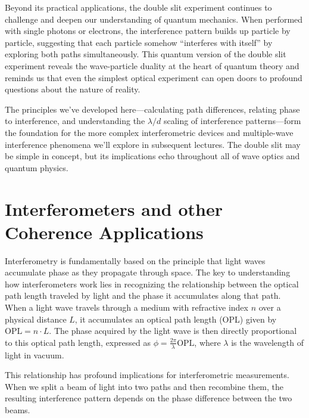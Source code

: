 \documentclass[
  a4paper,
]{book}
\begin{document}
Beyond its practical applications, the double slit experiment continues
to challenge and deepen our understanding of quantum mechanics. When
performed with single photons or electrons, the interference pattern
builds up particle by particle, suggesting that each particle somehow
``interferes with itself'' by exploring both paths simultaneously. This
quantum version of the double slit experiment reveals the wave-particle
duality at the heart of quantum theory and reminds us that even the
simplest optical experiment can open doors to profound questions about
the nature of reality.

The principles we've developed here---calculating path differences,
relating phase to interference, and understanding the \(\lambda/d\)
scaling of interference patterns---form the foundation for the more
complex interferometric devices and multiple-wave interference phenomena
we'll explore in subsequent lectures. The double slit may be simple in
concept, but its implications echo throughout all of wave optics and
quantum physics.

\chapter{Interferometers and other Coherence
Applications}\label{interferometers-and-other-coherence-applications}

Interferometry is fundamentally based on the principle that light waves
accumulate phase as they propagate through space. The key to
understanding how interferometers work lies in recognizing the
relationship between the optical path length traveled by light and the
phase it accumulates along that path. When a light wave travels through
a medium with refractive index \(n\) over a physical distance \(L\), it
accumulates an optical path length (OPL) given by
\(\text{OPL} = n \cdot L\). The phase acquired by the light wave is then
directly proportional to this optical path length, expressed as
\(\phi = \frac{2\pi}{\lambda} \text{OPL}\), where \(\lambda\) is the
wavelength of light in vacuum.

This relationship has profound implications for interferometric
measurements. When we split a beam of light into two paths and then
recombine them, the resulting interference pattern depends on the phase
difference between the two beams.
\end{document}
